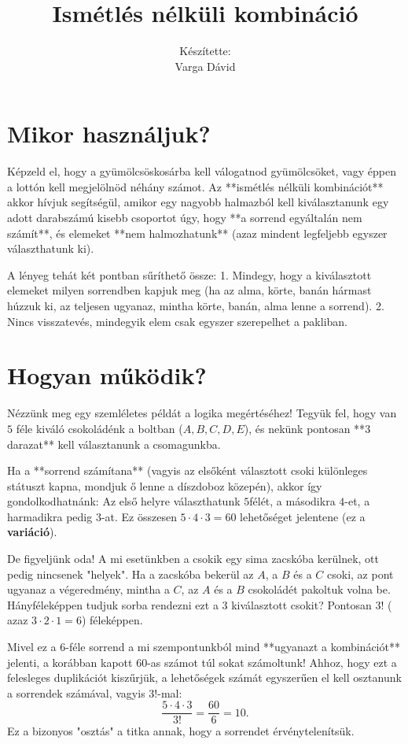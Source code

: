 \documentclass[a4paper,12pt]{article}
\title{Ismétlés nélküli kombináció}
\author{Készítette: \\Varga Dávid}
\theoremstyle{definition} %
\begin{document}
\maketitle

\section{Mikor használjuk?}
Képzeld el, hogy a gyümölcsöskosárba kell válogatnod gyümölcsöket, vagy éppen a lottón kell megjelölnöd néhány számot. Az **ismétlés nélküli kombinációt** akkor hívjuk segítségül, amikor egy nagyobb halmazból kell kiválasztanunk egy adott darabszámú kisebb csoportot úgy, hogy **a sorrend egyáltalán nem számít**, és elemeket **nem halmozhatunk** (azaz mindent legfeljebb egyszer választhatunk ki). 

A lényeg tehát két pontban sűríthető össze: 
1. Mindegy, hogy a kiválasztott elemeket milyen sorrendben kapjuk meg (ha az alma, körte, banán hármast húzzuk ki, az teljesen ugyanaz, mintha körte, banán, alma lenne a sorrend).
2. Nincs visszatevés, mindegyik elem csak egyszer szerepelhet a pakliban.

\section{Hogyan működik?}
Nézzünk meg egy szemléletes példát a logika megértéséhez! Tegyük fel, hogy van $5$ féle kiváló csokoládénk a boltban ($A, B, C, D, E$), és nekünk pontosan **$3$ darazat** kell választanunk a csomagunkba. 

Ha a **sorrend számítana** (vagyis az elsőként választott csoki különleges státuszt kapna, mondjuk ő lenne a díszdoboz közepén), akkor így gondolkodhatnánk:
Az első helyre választhatunk $5$félét, a másodikra $4$-et, a harmadikra pedig $3$-at. Ez összesen $5 \cdot 4 \cdot 3 = 60$ lehetőséget jelentene (ez a \textbf{variáció}).

De figyeljünk oda! A mi esetünkben a csokik egy sima zacskóba kerülnek, ott pedig nincsenek "helyek". Ha a zacskóba bekerül az $A$, a $B$ és a $C$ csoki, az pont ugyanaz a végeredmény, mintha a $C$, az $A$ és a $B$ csokoládét pakoltuk volna be. Hányféleképpen tudjuk sorba rendezni ezt a $3$ kiválasztott csokit? Pontosan $3!$ ( azaz $3 \cdot 2 \cdot 1 = 6$) féleképpen. 

Mivel ez a $6$-féle sorrend a mi szempontunkból mind **ugyanazt a kombinációt** jelenti, a korábban kapott $60$-as számot túl sokat számoltunk! Ahhoz, hogy ezt a felesleges duplikációt kiszűrjük, a lehetőségek számát egyszerűen el kell osztanunk a sorrendek számával, vagyis $3!$-mal:
$$\frac{5 \cdot 4 \cdot 3}{3!} = \frac{60}{6} = 10.$$
Ez a bizonyos "osztás" a titka annak, hogy a sorrendet érvénytelenítsük.
\end{document}

